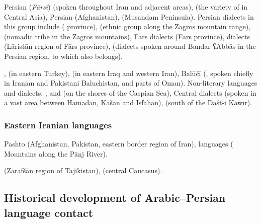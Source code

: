 \documentclass[output=paper]{langsci/langscibook}
\begin{document}
Persian (\textit{Fārsī}) (spoken throughout Iran and adjacent areas),  (the variety of  in Central Asia),  Persian (Afghanistan),  (Musandam Peninsula). Persian dialects in this group include  ( province),  (ethnic group along the Zagros mountain range),  (nomadic tribe in the Zagros mountains), Fārs dialects (Fārs province),  dialects (Lāristān region of Fārs province),  (dialects spoken around Bandar ʕAbbās in the Persian  region, to which  also belongs).



,  (in eastern Turkey),  (in eastern Iraq and western Iran), Balūčī (, spoken chiefly in Iranian and Pakistani Baluchistan, and parts of Oman). Non-literary languages and dialects: ,  and  (on the shores of the Caspian Sea), Central dialects (spoken in a vast area between Hamadān, Kāšān and Iṣfahān),  (south of the Dašt-i Kawīr).



\subsubsection{Eastern Iranian languages}

Pashto (Afghanistan, Pakistan, eastern border region of Iran),  languages ( Mountains along the Pānj River).

 (Zarafšān region of Tajikistan),  (central Caucasus).

\subsection{Historical development of Arabic–Persian language contact} %
\end{document}
